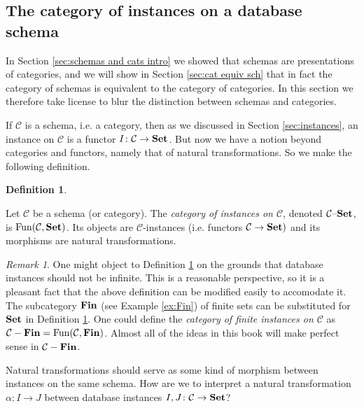 \documentclass{book}
\def\tn{\textnormal}
\def\mc{\mathcal}
\def\Fun{\tn{Fun}}
\def\to{\rightarrow}
\def\taking{\colon}
\def\Set{{\bf Set}}
\def\set{{\text \textendash}{\bf Set}}
\def\mcC{\mc{C}}
\theoremstyle{remark}
\newtheorem{remark}[subsubsection]{Remark}
\theoremstyle{definition}
\newtheorem{definition}[subsubsection]{Definition}
\def\Fin{{\bf Fin}}
\begin{document}

\subsection{The category of instances on a database schema}\index{a category!$\mcC\set$}

In Section \ref{sec:schemas and cats intro} we showed that schemas are presentations of categories, and we will show in Section \ref{sec:cat equiv sch} that in fact the category of schemas is equivalent to the category of categories. In this section we therefore take license to blur the distinction between schemas and categories.

If $\mcC$ is a schema, i.e. a category, then as we discussed in Section \ref{sec:instances}, an instance on $\mcC$ is a functor $I\taking\mcC\to\Set$. But now we have a notion beyond categories and functors, namely that of natural transformations. So we make the following definition.

\begin{definition}\label{def:mcC-set}

Let $\mcC$ be a schema (or category). The {\em category of instances on $\mcC$}, denoted $\mcC\set$, is $\Fun(\mcC,\Set)$. Its objects are $\mcC$-instances (i.e. functors $\mcC\to\Set)$ and its morphisms are natural transformations.

\end{definition}

\begin{remark}

One might object to Definition \ref{def:mcC-set} on the grounds that database instances should not be infinite. This is a reasonable perspective, so it is a pleasant fact that the above definition can be modified easily to accomodate it. The subcategory $\Fin$ (see Example \ref{ex:Fin}) of finite sets can be substituted for $\Set$ in Definition \ref{def:mcC-set}. One could define the {\em category of finite instances on $\mcC$} as $\mcC-\Fin=\Fun(\mcC,\Fin)$. Almost all of the ideas in this book will make perfect sense in $\mcC-\Fin$.

\end{remark}

Natural transformations should serve as some kind of morphism between instances on the same schema. How are we to interpret a natural transformation $\alpha\taking I\to J$ between database instances $I,J\taking\mcC\to\Set$? 
\end{document}
